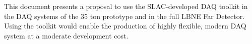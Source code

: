 This document presents a proposal to use the SLAC-developed DAQ toolkit 
in the DAQ systems of the 35 ton prototype and in the full LBNE Far Detector.
Using the toolkit would enable the production of highly flexible, modern DAQ
system at a moderate development cost.
